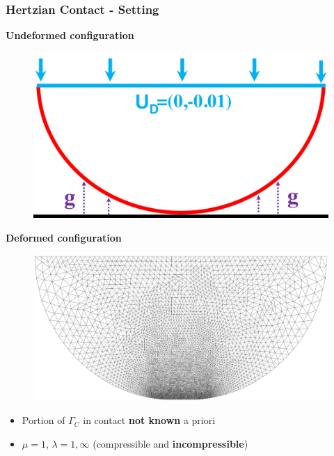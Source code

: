 \documentclass[8pt, oneside]{beamer}   	%
\newcommand{\titlecolor}[1]{\frametitle{\textcolor{dkgrey}{ \textbf{#1}}}}
\begin{document}
\begin{frame}
\titlecolor{Hertzian Contact - Setting}
\textbf{Undeformed configuration}
\begin{figure}[htbp!]
\includegraphics[scale=0.14]{img/signorinicircle.pdf} \end{figure}
\textbf{Deformed configuration}
\begin{figure}[htbp!]
\includegraphics[scale=0.09]{img/deformed_mesh.eps} 
\end{figure}
\begin{itemize}
\item Portion of $\Gamma_C$ in contact \textbf{not known} a priori
\item $ \mu = 1$, $ \lambda = 1, \infty$ (compressible and \textbf{incompressible})
\end{itemize}

\end{frame}

\end{document}
